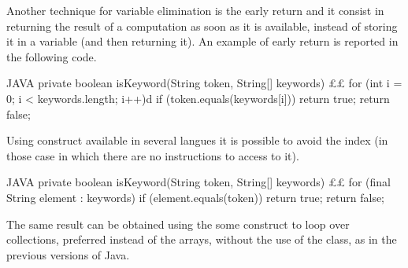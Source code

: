 Another technique for variable elimination is the early return and it consist
in returning the result of a computation as soon as it is available, instead of
storing it in a variable (and then returning it).  An example of early return
is reported in the following code.

\begin{code}{JAVA}
private boolean isKeyword(String token, String[] keywords) {££
    for (int i = 0; i < keywords.length; i++)d
        if (token.equals(keywords[i]))
            return true;
    return false;
}
\end{code}

Using  construct available in several langues it is possible to
avoid the index (in those case in which there are no instructions to access to
it).
\begin{code}{JAVA}
private boolean isKeyword(String token, String[] keywords) {££
    for (final String element : keywords)
        if (element.equals(token))
            return true;
    return false;
}
\end{code}
The same result can be obtained using the some construct to loop over
collections, preferred instead of the arrays, without the use of the
 class, as in the previous versions of Java.



